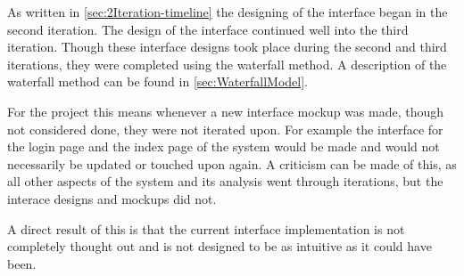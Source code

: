 As written in \cref{sec:2Iteration-timeline} the designing of the interface began in the second iteration.
The design of the interface continued well into the third iteration.
Though these interface designs took place during the second and third iterations, they were completed using the waterfall method.
A description of the waterfall method can be found in \cref{sec:WaterfallModel}.

For the project this means whenever a new interface mockup was made, though not considered done, they were not iterated upon.
For example the interface for the login page and the index page of the system would be made and would not necessarily be updated or touched upon again.
A criticism can be made of this, as all other aspects of the system and its analysis went through iterations, but the interace designs and mockups did not.

A direct result of this is that the current interface implementation is not completely thought out and is not designed to be as intuitive as it could have been.
